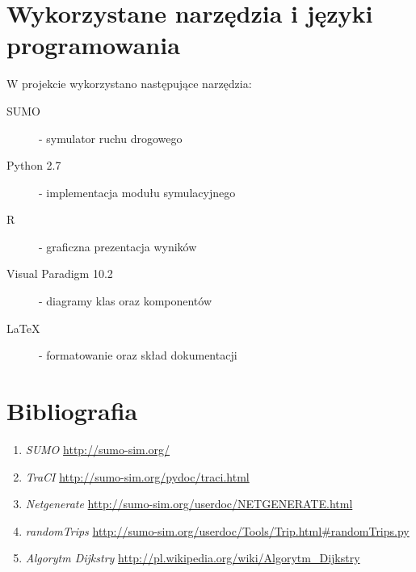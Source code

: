 \documentclass[11pt,a4paper]{article}
\begin{document}
\section{Wykorzystane narzędzia i języki programowania}

W projekcie wykorzystano następujące narzędzia:
\begin{description}
	\item[SUMO] - symulator ruchu drogowego
	\item[Python 2.7] - implementacja modułu symulacyjnego
	\item[R] - graficzna prezentacja wyników
	\item[Visual Paradigm 10.2] - diagramy klas oraz komponentów
	\item[LaTeX] - formatowanie oraz skład dokumentacji
\end{description}

\newpage
\section{Bibliografia}

\begin{enumerate}
	\item \textit{SUMO}
	\url{http://sumo-sim.org/}
	\item \textit{TraCI}
	\url{http://sumo-sim.org/pydoc/traci.html}
	\item \textit{Netgenerate}
	\url{http://sumo-sim.org/userdoc/NETGENERATE.html}
	\item \textit{randomTrips}
	\url{http://sumo-sim.org/userdoc/Tools/Trip.html#randomTrips.py}
	\item \textit{Algorytm Dijkstry}
	\url {http://pl.wikipedia.org/wiki/Algorytm_Dijkstry}
\end{enumerate}
\end{document}

